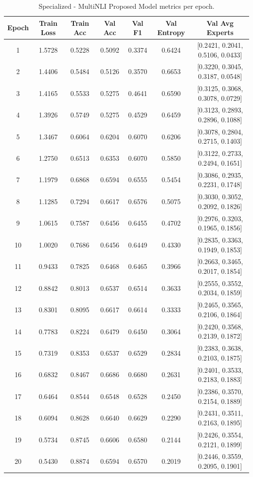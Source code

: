 \documentclass{article}
\begin{document}
\begin{table}[ht!]
\centering
\small
\scriptsize
\setlength{\tabcolsep}{3pt}
\renewcommand{\arraystretch}{1.1}
\begin{tabular}{c|ccccc|c}
\hline
\textbf{Epoch} & \textbf{Train Loss} & \textbf{Train Acc} & \textbf{Val Acc} & \textbf{Val F1} & \textbf{Val Entropy} & \textbf{Val Avg Experts} \\
\hline
1 & 1.5728 & 0.5228 & 0.5092 & 0.3374 & 0.6424 & [0.2421, 0.2041, 0.5106, 0.0433] \\
2 & 1.4406 & 0.5484 & 0.5126 & 0.3570 & 0.6653 & [0.3220, 0.3045, 0.3187, 0.0548] \\
3 & 1.4165 & 0.5533 & 0.5275 & 0.4641 & 0.6590 & [0.3125, 0.3068, 0.3078, 0.0729] \\
4 & 1.3926 & 0.5749 & 0.5275 & 0.4529 & 0.6459 & [0.3123, 0.2893, 0.2896, 0.1088] \\
5 & 1.3467 & 0.6064 & 0.6204 & 0.6070 & 0.6206 & [0.3078, 0.2804, 0.2715, 0.1403] \\
6 & 1.2750 & 0.6513 & 0.6353 & 0.6070 & 0.5850 & [0.3122, 0.2733, 0.2494, 0.1651] \\
7 & 1.1979 & 0.6868 & 0.6594 & 0.6555 & 0.5454 & [0.3086, 0.2935, 0.2231, 0.1748] \\
8 & 1.1285 & 0.7294 & 0.6617 & 0.6576 & 0.5075 & [0.3030, 0.3052, 0.2092, 0.1826] \\
9 & 1.0615 & 0.7587 & 0.6456 & 0.6455 & 0.4702 & [0.2976, 0.3203, 0.1965, 0.1856] \\
10 & 1.0020 & 0.7686 & 0.6456 & 0.6449 & 0.4330 & [0.2835, 0.3363, 0.1949, 0.1853] \\
11 & 0.9433 & 0.7825 & 0.6468 & 0.6465 & 0.3966 & [0.2663, 0.3465, 0.2017, 0.1854] \\
12 & 0.8842 & 0.8013 & 0.6537 & 0.6514 & 0.3633 & [0.2555, 0.3552, 0.2034, 0.1859] \\
13 & 0.8301 & 0.8095 & 0.6617 & 0.6614 & 0.3333 & [0.2465, 0.3565, 0.2106, 0.1864] \\
14 & 0.7783 & 0.8224 & 0.6479 & 0.6450 & 0.3064 & [0.2420, 0.3568, 0.2139, 0.1872] \\
15 & 0.7319 & 0.8353 & 0.6537 & 0.6529 & 0.2834 & [0.2383, 0.3638, 0.2103, 0.1875] \\
16 & 0.6832 & 0.8467 & 0.6686 & 0.6680 & 0.2631 & [0.2401, 0.3533, 0.2183, 0.1883] \\
17 & 0.6464 & 0.8544 & 0.6548 & 0.6528 & 0.2450 & [0.2386, 0.3570, 0.2154, 0.1889] \\
18 & 0.6094 & 0.8628 & 0.6640 & 0.6629 & 0.2290 & [0.2431, 0.3511, 0.2163, 0.1895] \\
19 & 0.5734 & 0.8745 & 0.6606 & 0.6580 & 0.2144 & [0.2426, 0.3554, 0.2121, 0.1899] \\
20 & 0.5430 & 0.8874 & 0.6594 & 0.6570 & 0.2019 & [0.2446, 0.3559, 0.2095, 0.1901] \\
\hline
\end{tabular}
\caption{Specialized - MultiNLI Proposed Model metrics per epoch.}
\label{tab:metrics}
\end{table}
\end{document}
